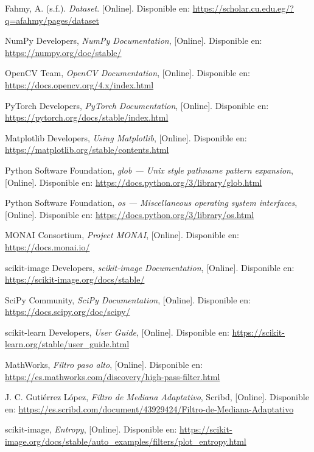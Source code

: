 \documentclass[12pt]{article}
\begin{document}
\begin{thebibliography}{9}

Fahmy, A. (s.f.). \textit{Dataset}. [Online]. Disponible en: \url{https://scholar.cu.edu.eg/?q=afahmy/pages/dataset}


NumPy Developers, \textit{NumPy Documentation}, [Online]. Disponible en: \url{https://numpy.org/doc/stable/}

OpenCV Team, \textit{OpenCV Documentation}, [Online]. Disponible en: \url{https://docs.opencv.org/4.x/index.html}

PyTorch Developers, \textit{PyTorch Documentation}, [Online]. Disponible en: \url{https://pytorch.org/docs/stable/index.html}

Matplotlib Developers, \textit{Using Matplotlib}, [Online]. Disponible en: \url{https://matplotlib.org/stable/contents.html}

Python Software Foundation, \textit{glob — Unix style pathname pattern expansion}, [Online]. Disponible en: \url{https://docs.python.org/3/library/glob.html}

Python Software Foundation, \textit{os — Miscellaneous operating system interfaces}, [Online]. Disponible en: \url{https://docs.python.org/3/library/os.html}

MONAI Consortium, \textit{Project MONAI}, [Online]. Disponible en: \url{https://docs.monai.io/}

scikit-image Developers, \textit{scikit-image Documentation}, [Online]. Disponible en: \url{https://scikit-image.org/docs/stable/}

SciPy Community, \textit{SciPy Documentation}, [Online]. Disponible en: \url{https://docs.scipy.org/doc/scipy/}

scikit-learn Developers, \textit{User Guide}, [Online]. Disponible en: \url{https://scikit-learn.org/stable/user_guide.html}

MathWorks, \textit{Filtro paso alto}, [Online]. Disponible en: \url{https://es.mathworks.com/discovery/high-pass-filter.html}

J. C. Gutiérrez López, \textit{Filtro de Mediana Adaptativo}, Scribd, [Online]. Disponible en: \url{https://es.scribd.com/document/43929424/Filtro-de-Mediana-Adaptativo}

scikit-image, \textit{Entropy}, [Online]. Disponible en: \url{https://scikit-image.org/docs/stable/auto_examples/filters/plot_entropy.html}


\end{thebibliography}
\end{document}
